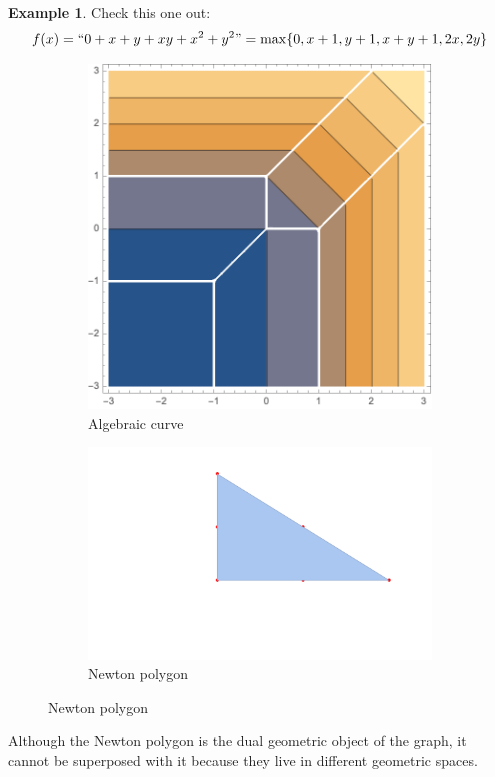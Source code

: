 \documentclass{article}
\theoremstyle{definition}
\newtheorem{ex}{Example}
\begin{document}
\begin{ex}\label{ex:ex6}
	Check this one out: $$f(x)=``0+x+y+xy+x^2+y^2"=\max\{0, x + 1, y + 1, x + y + 1, 2 x, 2 y\}$$
	
	\begin{figure}[H]
		\begin{subfigure}{.5\textwidth}
			\centering
			\includegraphics[width=0.9\linewidth]{8}
			\caption*{Algebraic curve}
		\end{subfigure}
		\begin{subfigure}{.5\textwidth}
			\centering
			\includegraphics[width=0.9\linewidth]{9}
			\caption*{Newton polygon}
		\end{subfigure}
	\end{figure}
	Although the Newton polygon is the dual geometric object of the graph, it cannot be superposed with it because they live in different geometric spaces.
\end{ex}
\end{document}
